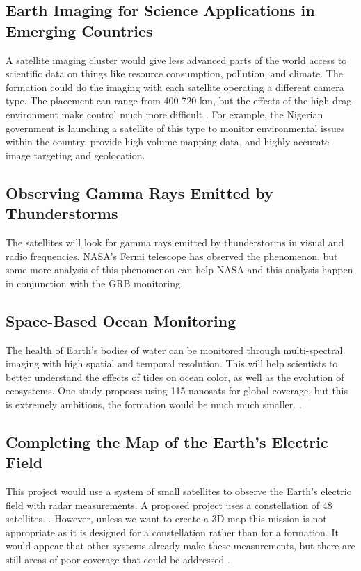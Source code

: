 \subsection{Earth Imaging for Science Applications in Emerging Countries}
\label{imaging_science}
A satellite imaging cluster would give less advanced parts of the world access to scientific data on things like resource consumption, pollution, and climate. The formation could do the imaging with each satellite operating a different camera type. The placement can range from 400-720 km, but the effects of the high drag environment make control much more difficult\cite{Ref:Harrison} \cite{Ref:Atir} \cite{Ref:Herscovitz}\cite{Ref:Kalman}\cite{Ref:Kim}. For example, the Nigerian government is launching a satellite of this type to monitor environmental issues within the country, provide high volume mapping data, and highly accurate image targeting and geolocation\cite{Ref:Curiel}. 

\subsection{Observing Gamma Rays Emitted by Thunderstorms}
\label{gamma_storm}
The satellites will look for gamma rays emitted by thunderstorms in visual and radio frequencies. NASA's Fermi telescope has observed the phenomenon, but some more analysis of this phenomenon can help NASA and this analysis happen in conjunction with the GRB monitoring.\cite{Ref:Fermi} \cite{Ref:Kitts}

\subsection{Space-Based Ocean Monitoring}
\label{ocean_monitor}

The health of Earth's bodies of water can be monitored through multi-spectral imaging with high spatial and temporal resolution. This will help scientists to better understand the effects of tides on ocean color, as well as the evolution of ecosystems. One study proposes using 115 nanosats for global coverage, but this is extremely ambitious, the formation would be much much smaller. \cite{Ref:Lowe}. %

\subsection{Completing the Map of the Earth's Electric Field}
\label{elec_field}
This project would use a system of small satellites to observe the Earth's electric field with radar measurements. A proposed project uses a constellation of 48 satellites. \cite{Ref:Redd}. However, unless we want to create a 3D map this mission is not appropriate as it is designed for a constellation rather than for a formation. It would appear that other systems already make these measurements, but there are still areas of poor coverage that could be addressed \cite{Ref:ElecMap}. 

